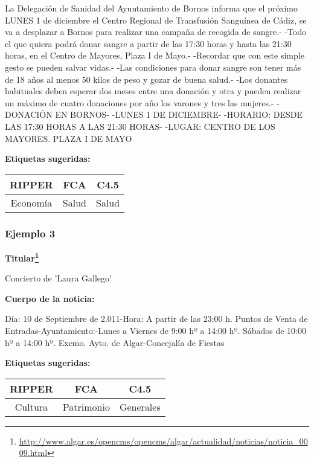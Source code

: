 La Delegación de Sanidad del Ayuntamiento de Bornos informa que el próximo LUNES 1 de diciembre el Centro Regional de Transfusión Sanguínea de Cádiz, se va a desplazar a Bornos para realizar una campaña de recogida de sangre.- -Todo el que quiera podrá donar sangre a partir de las 17:30 horas y hasta las 21:30 horas, en el Centro de Mayores, Plaza I de Mayo.- -Recordar que con este simple gesto se pueden salvar vidas.- -Las condiciones para donar sangre son tener más de 18 años al menos 50 kilos de peso y gozar de buena salud.- -Los donantes habituales deben esperar dos meses entre una donación y otra y pueden realizar un máximo de cuatro donaciones por año los varones y tres las mujeres.- -DONACIÓN EN BORNOS- -LUNES 1 DE DICIEMBRE- -HORARIO: DESDE LAS 17:30 HORAS A LAS 21:30 HORAS- -LUGAR: CENTRO DE LOS MAYORES. PLAZA I DE MAYO
\begin{center}


\textbf{Etiquetas sugeridas:}
\begin{tabular}{|c|c|c|}
 \hline 
 RIPPER & FCA & C4.5 \\ 
 \hline 
 Economía & Salud & Salud \\ 
 \hline 
\end{tabular}
\end{center}
 \subsubsection*{Ejemplo 3}
 
\textbf{Titular\footnote{\url{http://www.algar.es/opencms/opencms/algar/actualidad/noticias/noticia_0009.html}}}

Concierto de 'Laura Gallego'

\textbf{Cuerpo de la noticia:}

Día: 10 de Septiembre de 2.011-Hora: A partir de las 23:00 h.
Puntos de Venta de Entradas-Ayuntamiento:-Lunes a Viernes de 9:00 hº a 14:00 hº.
Sábados de 10:00 hº a 14:00 hº.
Excmo. Ayto. de Algar-Concejalía de Fiestas
\begin{center}


\textbf{Etiquetas sugeridas:}
\begin{tabular}{|c|c|c|}
 \hline 
 RIPPER & FCA &  C4.5\\ 
 \hline 
 Cultura & Patrimonio & Generales \\ 
 \hline 
\end{tabular}
\end{center}